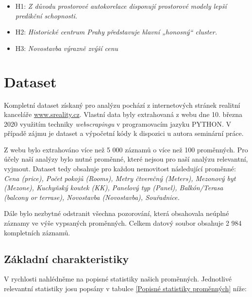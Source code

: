 \documentclass[11pt, a4paper]{article}
\begin{document}
  \begin{itemize}
\item H{1}: \textit{Z důvodu prostorové autokorelace disponují prostorové modely lepší predikční schopnosti.}

\item H{2}: \textit{Historické centrum Prahy představuje hlavní „honosný“ cluster.}

\item H{3}: \textit{Novostavba výrazně zvýší cenu}
\end{itemize}

\section{Dataset}

Kompletní dataset získaný pro analýzu pochází z internetových stránek realitní kanceláře \url{www.sreality.cz}. Vlastní data byly extrahovaná z webu dne 10. března 2020 využitím techniky \textit{webscrapingu} v programovacím jazyku PYTHON. V případě zájmu je dataset a výpočetní kódy k dispozici u autora seminární práce. 

Z webu bylo extrahováno více než 5 000 záznamů o více než 100 proměnných. Pro účely naší analýzy bylo nutné proměnné, které nejsou pro naší analýzu relevantní, vyjmout. Dataset tedy obsahuje pro každou nemovitost následující proměnné: \textit{Cena (price), Počet pokojů (Rooms), Metry čtverečný (Meters), Mezonový byt (Mezone), Kuchyňský koutek (KK), Panelový typ (Panel), Balkón/Terasa (balcony or terrase), Novostavba (Novostavba), Souřadnice.} 

Dále bylo nezbytné odstranit všechna pozorování, která obsahovala neúplné záznamy ve výše vypsaných proměnných. Celkem datový soubor obsahuje 2 984 kompletních záznamů.

\subsection{Základní charakteristiky}

V rychlosti nahlédněme na popisné statistiky našich proměnných. Jednotlivé relevantní statistiky josu popsány v tabulce \ref{Popisné statistiky proměnných} níže:
  
\end{document}
